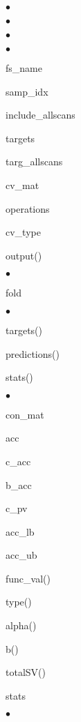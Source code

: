 \begin{list}{$\bullet$}
\begin{list}{$\bullet$}
\begin{list}{$\bullet$}
\begin{list}{$\bullet$}
            \item fs\_name
            \end{list}
        \item samp\_idx
        \item include\_allscans
        \item targets
        \item targ\_allscans
        \item cv\_mat
        \item operations
        \item cv\_type
        \end{list}
    \item output()
        \begin{list}{$\bullet$}
            {\setlength{\labelsep}{.2cm}\setlength{\itemindent}{0cm}\setlength{\leftmargin}{1.2cm}}
        \item fold
            \begin{list}{$\bullet$}
                {\setlength{\labelsep}{.2cm}\setlength{\itemindent}{0cm}\setlength{\leftmargin}{1.7cm}}
            \item targets()
            \item predictions()
            \item stats()
                \begin{list}{$\bullet$}
                    {\setlength{\labelsep}{.2cm}\setlength{\itemindent}{0cm}\setlength{\leftmargin}{2.2cm}}
                \item con\_mat
                \item acc
                \item c\_acc
                \item b\_acc
                \item c\_pv
                \item acc\_lb
                \item acc\_ub
                \end{list}
            \item func\_val()
            \item type()
            \item alpha()
            \item b()
            \item totalSV()
            \end{list}
        \item stats
            \begin{list}{$\bullet$}
                {\setlength{\labelsep}{.2cm}\setlength{\itemindent}{0cm}\setlength{\leftmargin}{1.7cm}}

\end{list}
\end{list}
\end{list}
\end{list}
